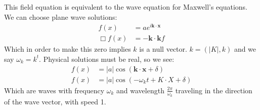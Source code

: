 This field equation is equivalent to the wave equation for Maxwell's equations. We can choose plane wave solutions:
\begin{align*}
	f(x) &= a e^{i\bm{k}\cdot\bm{x}} \\
	\Box f(x) &= -\bm{k}\cdot\bm{k} f
\end{align*}
Which in order to make this zero implies $k$ is a null vector. $k = (|K|,k)$ and we say $\omega_k = k^t$.
Physical solutions must be real, so we see:
\begin{align*}
	f(x) &= |a|\cos(\bm{k}\cdot\bm{x} + \delta) \\
	f(x) &= |a|\cos(-\omega_k t + K\cdot X + \delta)
\end{align*}
Which are waves with frequency $\omega_k$ and wavelength $\frac{2\pi}{\omega_k}$ traveling in the direction of the wave vector, with speed 1.

